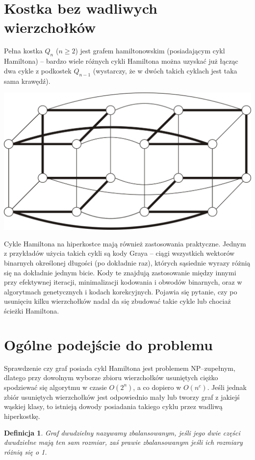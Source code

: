 \documentclass{pracamgr}
\newtheorem{defi}[theorem]{Definicja}
\begin{document}
  \section{Kostka bez wadliwych wierzchołków}

   Pełna kostka $Q_n$ ($n\ge2$) jest grafem hamiltonowskim (posiadającym cykl Hamiltona)
   -- bardzo wiele różnych cykli Hamiltona można uzyskać już łącząc dwa cykle
   z podkostek $Q_{n-1}$ (wystarczy, że w dwóch takich cyklach jest taka sama krawędź).
   \begin{center}
    \includegraphics[scale=0.5]{img/Q4_hamilton.jpg}
   \end{center}
   Cykle Hamiltona na hiperkostce mają również zastosowania praktyczne. Jednym z przykładów użycia takich cykli są kody Graya
   -- ciągi wszystkich wektorów binarnych określonej długości (po dokładnie raz), których sąsiednie wyrazy różnią się na dokładnie jednym bicie.
   Kody te znajdują zastosowanie między innymi przy efektywnej iteracji, minimalizacji kodowania i obwodów binarnych,
   oraz w algorytmach genetycznych i kodach korekcyjnych.\newline
   Pojawia się pytanie, czy po usunięciu kilku wierzchołków nadal da się zbudować takie cykle lub chociaż ścieżki Hamiltona.
  \section{Ogólne podejście do problemu}
   Sprawdzenie czy graf posiada cykl Hamiltona jest problemem NP--zupełnym, dlatego przy dowolnym wyborze zbioru wierzchołków usuniętych
   ciężko spodziewać się algorytmu w czasie $O(2^n)$, a co dopiero w $O(n^c)$. Jeśli jednak zbiór usuniętych wierzchołków
   jest odpowiednio mały lub tworzy graf z jakiejś wąskiej klasy, to istnieją dowody posiadania takiego cyklu przez wadliwą hiperkostkę.
   \begin{defi}\label{graf zbalansowany}
    Graf dwudzielny nazywamy \emph{zbalansowanym}, jeśli jego dwie części dwudzielne mają ten sam rozmiar,
    zaś \emph{prawie zbalansowanym} jeśli ich rozmiary różnią się o 1.
   \end{defi}    
   
\end{document}
